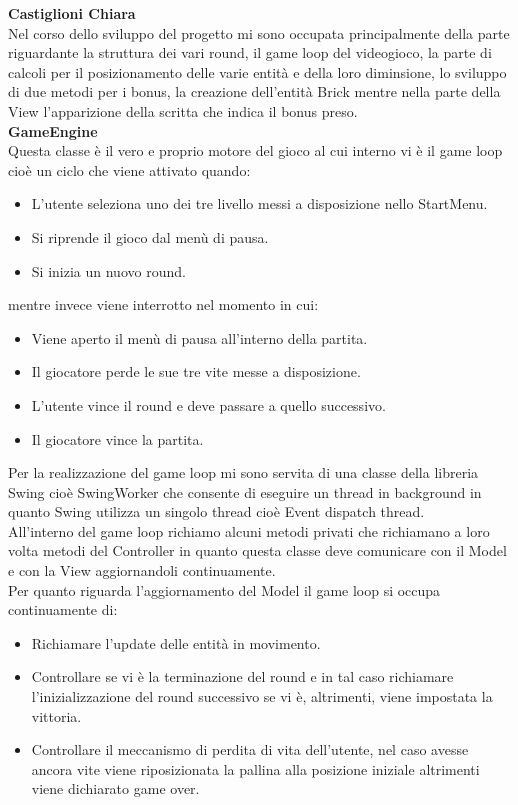 \documentclass[a4paper,12pt]{report}
\begin{document}
\textbf{Castiglioni Chiara}\\
Nel corso dello sviluppo del progetto mi sono occupata principalmente della parte riguardante la struttura dei vari round, il game loop del videogioco,
la parte di calcoli per il posizionamento delle varie entità e della loro diminsione, lo sviluppo di due metodi per i bonus, la creazione dell'entità Brick
mentre nella parte della View l'apparizione della scritta che indica il bonus preso.\\
\textbf{GameEngine}
\\Questa classe è il vero e proprio motore del gioco al cui interno vi è il game loop cioè un ciclo che viene attivato quando:
\begin{itemize}
    \item L'utente seleziona uno dei tre livello messi a disposizione nello StartMenu.
    \item Si riprende il gioco dal menù di pausa.
    \item Si inizia un nuovo round.
\end{itemize}
mentre invece viene interrotto nel momento in cui:
\begin{itemize}
    \item Viene aperto il menù di pausa all'interno della partita.
    \item Il giocatore perde le sue tre vite messe a disposizione.
    \item L'utente vince il round e deve passare a quello successivo.
    \item Il giocatore vince la partita.
\end{itemize}
Per la realizzazione del game loop mi sono servita di una classe della libreria Swing cioè SwingWorker che consente di eseguire un thread in background
in quanto Swing utilizza un singolo thread cioè Event dispatch thread.
\\All'interno del game loop richiamo alcuni metodi privati che richiamano a loro volta metodi del Controller in quanto questa classe deve comunicare con il Model
e con la View aggiornandoli continuamente.
\\Per quanto riguarda l'aggiornamento del Model il game loop si occupa continuamente di:
\begin{itemize}
    \item Richiamare l'update delle entità in movimento.
    \item Controllare se vi è la terminazione del round e in tal caso richiamare l'inizializzazione del round successivo se vi è, altrimenti, viene impostata la vittoria.
    \item Controllare il meccanismo di perdita di vita dell'utente, nel caso avesse ancora vite viene riposizionata la pallina alla posizione iniziale altrimenti viene dichiarato game over.
\end{itemize}
\end{document}
